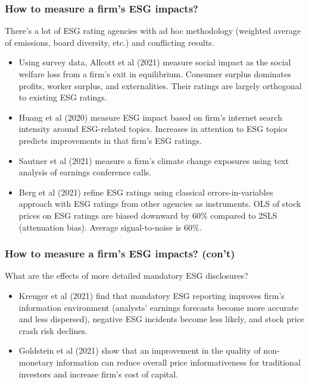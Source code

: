 \documentclass{beamer}
\begin{document}
\begin{frame}
\frametitle{How to measure a firm's ESG impacts?}
There's a lot of ESG rating agencies with ad hoc methodology (weighted average of emissions, board diversity, etc.) and conflicting results.
\bigskip
\begin{itemize}[<+->]
\item Using survey data, Allcott et al (2021) measure social impact as the social welfare loss from a firm's exit in equilibrium. Consumer surplus dominates profits, worker surplus, and externalities. Their ratings are largely orthogonal to existing ESG ratings.
\bigskip
\item Huang et al (2020) measure ESG impact based on firm's internet search intensity around ESG-related topics. Increases in attention to ESG topics predicts
improvements in that firm's ESG ratings.
\bigskip
\item Sautner et al (2021) measure a firm's climate change exposures using text analysis of earnings conference calls.
\bigskip
\item Berg et al (2021) refine ESG ratings using classical errors-in-variables approach with ESG ratings from other agencies as instruments. OLS of stock prices on ESG ratings are biased downward by 60\% compared to 2SLS (attenuation bias). Average signal-to-noise is 60\%.
\end{itemize}
\end{frame}



\begin{frame}
\frametitle{How to measure a firm's ESG impacts? (con't)} 
What are the effects of more detailed mandatory ESG disclosures?
\bigskip
\begin{itemize}[<+->]
\item Kreuger et al (2021) find that mandatory ESG reporting improves firm's information
environment (analysts' earnings forecasts become more accurate and less dispersed), negative ESG incidents become less likely, and stock price crash risk declines.
\bigskip
\item Goldstein et al (2021) show that an improvement in
the quality of non-monetary information can reduce overall price informativeness for traditional investors
and increase firm's cost of capital. 
\end{itemize}
\end{frame}
\end{document}
